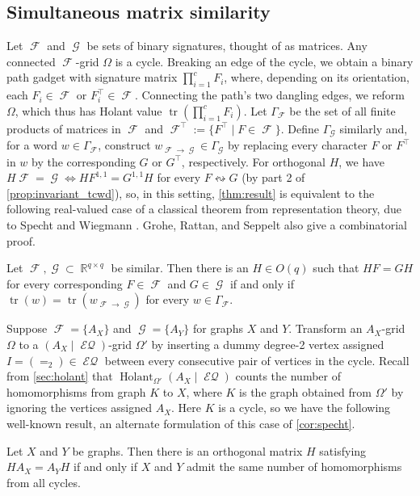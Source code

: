 \documentclass{theoretics}
\DeclareMathOperator{\tr}{tr}
\DeclareMathOperator{\rr}{\mathbb{R}}
\DeclareMathOperator{\fc}{\mathcal{F}}
\DeclareMathOperator{\gc}{\mathcal{G}}
\DeclareMathOperator{\holant}{Holant}
\DeclareMathOperator{\eq}{\mathcal{EQ}}
\begin{document}
\subsection{Simultaneous matrix similarity}
Let $\fc$ and $\gc$ be sets of binary signatures, thought of as matrices. Any connected $\fc$-grid
$\Omega$
is a cycle. Breaking an edge of the cycle, we obtain a binary path gadget with signature matrix
$\prod_{i=1}^c F_i$, where, depending on its orientation, each $F_i \in \fc$ or $F_i^\top \in \fc$.
Connecting the path's two dangling edges, we reform $\Omega$, which thus has Holant value
$\tr\left(\prod_{i=1}^c F_i\right)$. Let $\Gamma_{\fc}$ be the set of all finite products of
matrices in $\fc$ and $\fc^\top := \{F^\top \mid F \in \fc\}$. Define $\Gamma_{\gc}$ similarly and,
for a word $w \in \Gamma_{\fc}$, construct $w_{\fc\to\gc} \in \Gamma_{\gc}$ by replacing every character
$F$ or $F^\top$ in $w$ by the corresponding $G$ or $G^\top$, respectively. 
For orthogonal $H$, we have $H\fc = \gc \iff HF^{1,1} = G^{1,1}H$ for every $F \leftrightsquigarrow G$
(by part 2 of \autoref{prop:invariant_tcwd}), so, in this
setting, \autoref{thm:result} is equivalent to the following real-valued case of a
classical theorem from representation theory, due to Specht \cite{specht} and Wiegmann \cite{wiegmann}.
Grohe, Rattan, and Seppelt \cite{grohe_homomorphism_2022} also give a combinatorial proof.
\begin{corollary}
    Let $\fc, \gc \subset \rr^{q\times q}$ be similar. 
    Then there is an $H \in O(q)$ such that $HF = GH$ 
    for every corresponding $F \in \fc$ and $G \in \gc$ if and only if
    $\tr(w) = \tr(w_{\fc\to\gc})$ for every $w \in \Gamma_{\fc}$.
    \label{cor:specht}
\end{corollary}

Suppose $\fc = \{A_X\}$ and $\gc = \{A_Y\}$ for graphs $X$ and $Y$.
Transform an
$A_X$-grid $\Omega$ to a $(A_X \mid \eq)$-grid $\Omega'$ by inserting a dummy degree-2 vertex assigned 
$I = (=_2) \in \eq$ between every consecutive pair of vertices in the cycle. Recall from
\autoref{sec:holant} that
$\holant_{\Omega'}(A_X \mid \eq)$ counts the number of homomorphisms from graph $K$ to $X$, where $K$ is the graph obtained from $\Omega'$ by ignoring the vertices assigned $A_X$. Here
$K$ is a cycle, so we have the following well-known result, an alternate formulation
of this case of \autoref{cor:specht}.
\begin{corollary}
    Let $X$ and $Y$ be graphs. Then there is an orthogonal matrix $H$ satisfying $H A_X = A_Y H$
    if and only if $X$ and $Y$ admit the same number of homomorphisms from all cycles.
    \label{cor:cycle}
\end{corollary}
\end{document}
